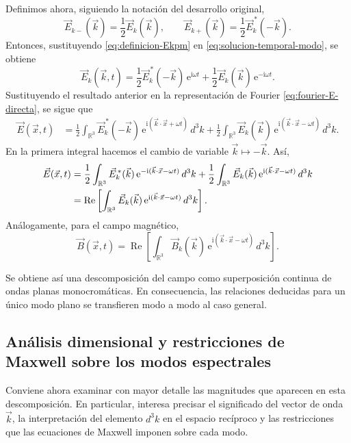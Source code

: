 \documentclass[12pt,a4paper]{article}
\theoremstyle{definition}
\theoremstyle{plain}
\numberwithin{equation}{section}
\theoremstyle{remark}
\newcommand{\ii}{\mathrm{i}}
\newcommand{\ee}{\mathrm{e}}
\begin{document}
Definimos ahora, siguiendo la notación del desarrollo original,
\begin{equation}
    \vec E_{k-}(\vec k)=\frac{1}{2}\vec E_k(\vec k),
    \qquad
    \vec E_{k+}(\vec k)=\frac{1}{2}\vec E_k^{\,*}(-\vec k).
    \label{eq:definicion-Ekpm}
\end{equation}
Entonces, sustituyendo \eqref{eq:definicion-Ekpm} en \eqref{eq:solucion-temporal-modo}, se obtiene
\begin{equation*}
    \vec E_k(\vec k,t)=\frac{1}{2}\vec E_k^{\,*}(-\vec k)\,\ee^{\ii\omega t}+\frac{1}{2}\vec E_k(\vec k)\,\ee^{-\ii\omega t}.
\end{equation*}
Sustituyendo el resultado anterior en la representación de Fourier \eqref{eq:fourier-E-directa}, se sigue que
\begin{align*}
    \vec E(\vec x,t)
    &=\frac{1}{2}\int_{\mathbb R^3}\vec E_k^{\,*}(-\vec k)\,\ee^{\ii(\vec k\cdot\vec x+\omega t)}\,d^3k
      +\frac{1}{2}\int_{\mathbb R^3}\vec E_k(\vec k)\,\ee^{\ii(\vec k\cdot\vec x-\omega t)}\,d^3k.
\end{align*}
En la primera integral hacemos el cambio de variable $\vec k\mapsto -\vec k$. Así,
\begin{align*}
    \vec E(\vec x,t)
    &=\frac{1}{2}\int_{\mathbb R^3}\vec E_k^{\,*}(\vec k)\,\ee^{-\ii(\vec k\cdot\vec x-\omega t)}\,d^3k
      +\frac{1}{2}\int_{\mathbb R^3}\vec E_k(\vec k)\,\ee^{\ii(\vec k\cdot\vec x-\omega t)}\,d^3k 
\notag\\
    &=\operatorname{Re}\left[\int_{\mathbb R^3}\vec E_k(\vec k)\,\ee^{\ii(\vec k\cdot\vec x-\omega t)}\,d^3k\right].
\end{align*}
Análogamente, para el campo magnético,
\begin{equation*}
    \vec B(\vec x,t)=\operatorname{Re}\left[\int_{\mathbb R^3}\vec B_k(\vec k)\,\ee^{\ii(\vec k\cdot\vec x-\omega t)}\,d^3k\right].
\end{equation*}

Se obtiene así una descomposición del campo como superposición continua de ondas planas monocromáticas. En consecuencia, las relaciones deducidas para un único modo plano se transfieren modo a modo al caso general.

\subsection{Análisis dimensional y restricciones de Maxwell sobre los modos espectrales}

Conviene ahora examinar con mayor detalle las magnitudes que aparecen en esta descomposición. En particular, interesa precisar el significado del vector de onda $\vec k$, la interpretación del elemento $d^3k$ en el espacio recíproco y las restricciones que las ecuaciones de Maxwell imponen sobre cada modo.
\end{document}
